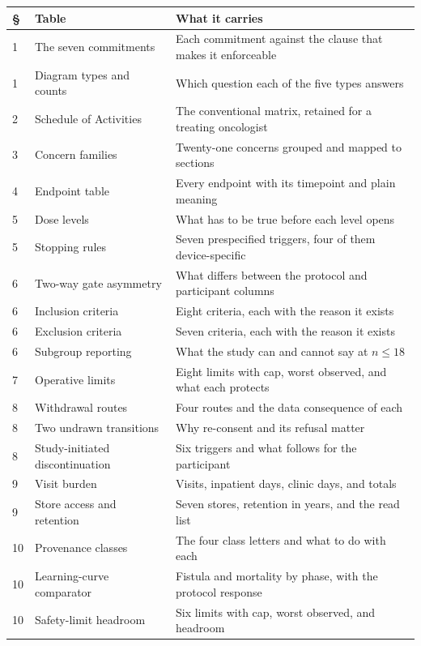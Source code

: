 \noindent\begin{tabularx}{\textwidth}{C{1.0cm} L{4.6cm} Y}
\toprule
\textbf{\S} & \textbf{Table} & \textbf{What it carries} \\
 & The seven commitments & Each commitment against the clause that makes it enforceable \\
1 & Diagram types and counts & Which question each of the five types answers \\
2 & Schedule of Activities & The conventional matrix, retained for a treating oncologist \\
3 & Concern families & Twenty-one concerns grouped and mapped to sections \\
4 & Endpoint table & Every endpoint with its timepoint and plain meaning \\
5 & Dose levels & What has to be true before each level opens \\
5 & Stopping rules & Seven prespecified triggers, four of them device-specific \\
6 & Two-way gate asymmetry & What differs between the protocol and participant columns \\
6 & Inclusion criteria & Eight criteria, each with the reason it exists \\
6 & Exclusion criteria & Seven criteria, each with the reason it exists \\
6 & Subgroup reporting & What the study can and cannot say at $n \leq 18$ \\
7 & Operative limits & Eight limits with cap, worst observed, and what each protects \\
8 & Withdrawal routes & Four routes and the data consequence of each \\
8 & Two undrawn transitions & Why re-consent and its refusal matter \\
8 & Study-initiated discontinuation & Six triggers and what follows for the participant \\
9 & Visit burden & Visits, inpatient days, clinic days, and totals \\
9 & Store access and retention & Seven stores, retention in years, and the read list \\
10 & Provenance classes & The four class letters and what to do with each \\
10 & Learning-curve comparator & Fistula and mortality by phase, with the protocol response \\
10 & Safety-limit headroom & Six limits with cap, worst observed, and headroom \\

\end{tabularx}
